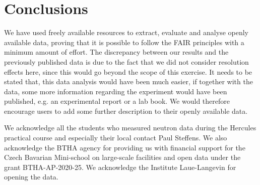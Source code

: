\documentclass[aps,pra,reprint,amsmath,amssymb,superscriptaddress,showkeys]{revtex4-1}
\begin{document}
\section{Conclusions}

We have used freely available resources to extract, evaluate and analyse openly available data, proving that it is possible to follow the FAIR principles with a minimum amount of effort. 
The discrepancy between our results and the previously published data \cite{Aouissi} is due to the fact that we did not consider resolution effects here, since this would go beyond the scope of this exercise.
It needs to be stated that, this data analysis would have been much easier, if together with the data, some more information regarding the experiment would have been published, e.g. an experimental report or a lab book.
We would therefore encourage users to add some further description to their openly available data. 


\begin{acknowledgments}
We acknowledge all the students who measured neutron data \cite{data} during the Hercules practical course and especially their local contact Paul Steffens. 
We also acknowledge the BTHA agency for providing us with financial support for the Czech Bavarian Mini-school on large-scale facilities and open data under the grant BTHA-AP-2020-25. We acknowledge the Institute Laue-Langevin for opening the data.
\end{acknowledgments}



\end{document}
